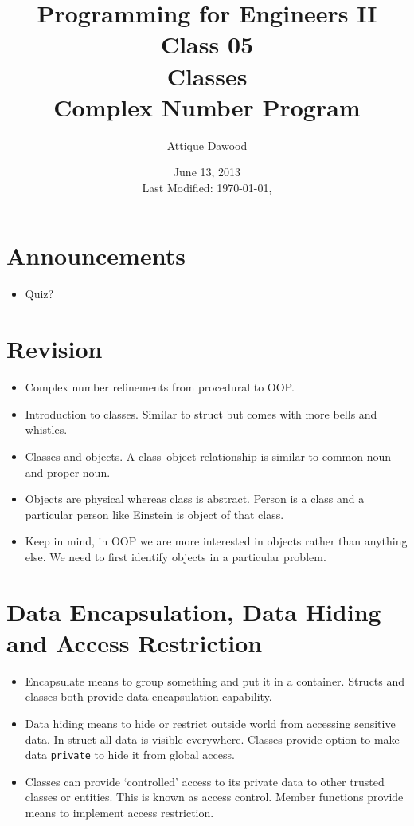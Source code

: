 \documentclass[12pt,a4paper]{article}
\title{\vspace{-2cm}Programming for Engineers II\\Class 05\\Classes\\Complex Number Program}
\author{Attique Dawood}
\date{June 13, 2013\\[0.2cm] Last Modified: \today, \currenttime}
\begin{document}
\maketitle
\section{Announcements}
\begin{itemize}
\item Quiz?
\end{itemize}
\section{Revision}
\begin{itemize}
\item Complex number refinements from procedural to OOP.
\item Introduction to classes. Similar to struct but comes with more bells and whistles.
\item Classes and objects. A class--object relationship is similar to common noun and proper noun.
\item Objects are physical whereas class is abstract. Person is a class and a particular person like Einstein is object of that class.
\item Keep in mind, in OOP we are more interested in objects rather than anything else. We need to first identify objects in a particular problem.
\end{itemize}
\section{Data Encapsulation, Data Hiding and Access Restriction}
\begin{itemize}
\item Encapsulate means to group something and put it in a container. Structs and classes both provide data encapsulation capability.
\item Data hiding means to hide or restrict outside world from accessing sensitive data. In struct all data is visible everywhere. Classes provide option to make data \verb|private| to hide it from global access.
\item Classes can provide `controlled' access to its private data to other trusted classes or entities. This is known as access control. Member functions provide means to implement access restriction.
\end{itemize}
\end{document}
